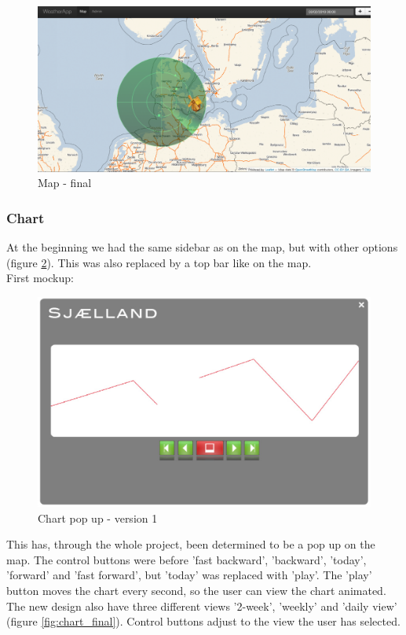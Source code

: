 \begin{figure}[htbp]
   \centering
   \includegraphics[width=1\linewidth]{figure/design_map_final.eps}
   \caption{Map - final}
   \label{fig:map_final}
\end{figure}

\subsubsection{Chart}
At the beginning we had the same sidebar as on the map, but with other options (figure \ref{fig:chart_v1}). This was also replaced by a top bar like on the map.\\
First mockup: 
\begin{figure}[htbp]
   \centering
   \includegraphics[width=1\linewidth]{figure/design_chart_v1.eps}
   \caption{Chart pop up - version 1}
   \label{fig:chart_v1}
\end{figure}

This has, through the whole project, been determined to be a pop up on the map.
The control buttons were before 'fast backward', 'backward', 'today', 'forward' and 'fast forward', but 'today' was replaced with 'play'. The 'play' button moves the chart every second, so the user can view the chart animated.\\
The new design also have three different views '2-week', 'weekly' and 'daily view' (figure \ref{fig:chart_final}). Control buttons adjust to the view the user has selected.

